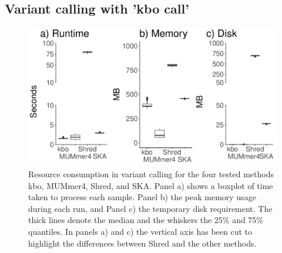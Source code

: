 \documentclass[unnumsec,webpdf,contemporary,large]{oup-authoring-template}%
\theoremstyle{thmstyleone}%
\theoremstyle{thmstyletwo}%
\theoremstyle{thmstylethree}%
\newcommand{\kbo}{{\sf kbo}}
\begin{document}
\subsection{Variant calling with 'kbo call'}
\begin{figure}
    \centering
    \includegraphics[width=1.0\linewidth]{fig/variant_calling_resource_consumption.pdf}
    \caption{Resource consumption in variant calling for the four tested methods \kbo, MUMmer4, Shred, and SKA. Panel a) shows a boxplot of time taken to process each sample. Panel b) the peak memory usage during each run, and Panel c) the temporary disk requirement. The thick lines denote the median and the whiskers the 25\% and 75\% quantiles. In panels a) and c) the vertical axis has been cut to highlight the differences between Shred and the other methods.}
    \label{fig:vc-resource-usage}
\end{figure}
\end{document}
